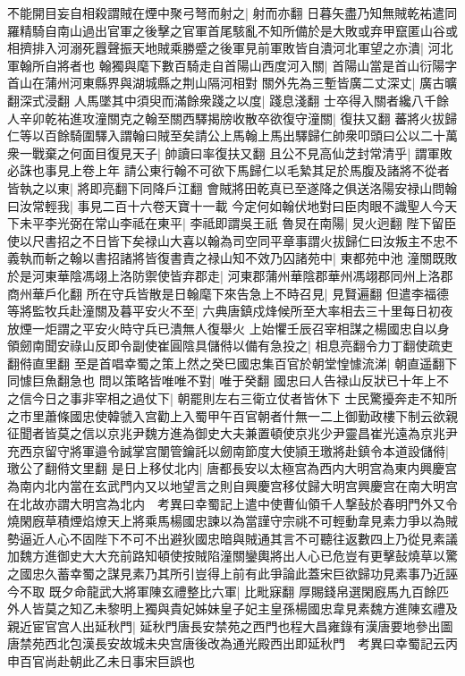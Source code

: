 不能開目妄自相殺謂賊在煙中聚弓弩而射之|{
	射而亦翻}
日暮矢盡乃知無賊乾祐遣同羅精騎自南山過出官軍之後擊之官軍首尾駭亂不知所備於是大敗或弃甲竄匿山谷或相擠排入河溺死囂聲振天地賊乘勝蹙之後軍見前軍敗皆自潰河北軍望之亦潰|{
	河北軍翰所自將者也}
翰獨與麾下數百騎走自首陽山西度河入關|{
	首陽山當是首山衍陽字首山在蒲州河東縣界與湖城縣之荆山隔河相對}
關外先為三塹皆廣二丈深丈|{
	廣古曠翻深式浸翻}
人馬墜其中須臾而滿餘衆踐之以度|{
	踐息淺翻}
士卒得入關者纔八千餘人辛卯乾祐進攻潼關克之翰至關西驛揭牓收散卒欲復守潼關|{
	復扶又翻}
蕃將火拔歸仁等以百餘騎圍驛入謂翰曰賊至矣請公上馬翰上馬出驛歸仁帥衆叩頭曰公以二十萬衆一戰棄之何面目復見天子|{
	帥讀曰率復扶又翻}
且公不見高仙芝封常清乎|{
	謂軍敗必誅也事見上卷上年}
請公東行翰不可欲下馬歸仁以毛縶其足於馬腹及諸將不從者皆執之以東|{
	將即亮翻下同降戶江翻}
會賊將田乾真已至遂降之俱送洛陽安禄山問翰曰汝常輕我|{
	事見二百十六卷天寶十一載}
今定何如翰伏地對曰臣肉眼不識聖人今天下未平李光弼在常山李祗在東平|{
	李祗即謂吳王祇}
魯炅在南陽|{
	炅火迥翻}
陛下留臣使以尺書招之不日皆下矣禄山大喜以翰為司空同平章事謂火拔歸仁曰汝叛主不忠不義執而斬之翰以書招諸將皆復書責之禄山知不效乃囚諸苑中|{
	東都苑中池}
潼關既敗於是河東華陰馮翊上洛防禦使皆弃郡走|{
	河東郡蒲州華陰郡華州馮翊郡同州上洛郡商州華戶化翻}
所在守兵皆散是日翰麾下來告急上不時召見|{
	見賢遍翻}
但遣李福德等將監牧兵赴潼關及暮平安火不至|{
	六典唐鎮戍烽候所至大率相去三十里每日初夜放煙一炬謂之平安火時守兵已潰無人復舉火}
上始懼壬辰召宰相謀之楊國忠自以身領劒南聞安祿山反即令副使崔圓陰具儲偫以備有急投之|{
	相息亮翻令力丁翻使疏吏翻偫直里翻}
至是首唱幸蜀之策上然之癸巳國忠集百官於朝堂惶懅流涕|{
	朝直遥翻下同懅巨魚翻急也}
問以策略皆唯唯不對|{
	唯于癸翻}
國忠曰人告禄山反狀已十年上不之信今日之事非宰相之過仗下|{
	朝罷則左右三衛立仗者皆休下}
士民驚擾奔走不知所之市里蕭條國忠使韓虢入宫勸上入蜀甲午百官朝者什無一二上御勤政樓下制云欲親征聞者皆莫之信以京兆尹魏方進為御史大夫兼置頓使京兆少尹靈昌崔光遠為京兆尹充西京留守將軍邉令誠掌宫闈管鑰託以劒南節度大使頴王璬將赴鎮令本道設儲偫|{
	璬公了翻偫文里翻}
是日上移仗北内|{
	唐都長安以太極宫為西内大明宫為東内興慶宫為南内北内當在玄武門内又以地望言之則自興慶宫移仗歸大明宫興慶宫在南大明宫在北故亦謂大明宫為北内　考異曰幸蜀記上遣中使曹仙領千人撃鼔於春明門外又令燒閑廐草積煙焰燎天上將乘馬楊國忠諫以為當謹守宗祧不可輕動韋見素力爭以為賊勢逼近人心不固陛下不可不出避狄國忠暗與賊通其言不可聽往返數四上乃從見素議加魏方進御史大大充前路知頓使按賊陷潼關鑾輿將出人心已危豈有更擊鼔燒草以驚之國忠久蓄幸蜀之謀見素乃其所引豈得上前有此爭論此蓋宋巨欲歸功見素事乃近誣今不取}
既夕命龍武大將軍陳玄禮整比六軍|{
	比毗寐翻}
厚賜錢帛選閑廐馬九百餘匹外人皆莫之知乙未黎明上獨與貴妃姊妹皇子妃主皇孫楊國忠韋見素魏方進陳玄禮及親近宦官宫人出延秋門|{
	延秋門唐長安禁苑之西門也程大昌雍錄有漢唐要地參出圖唐禁苑西北包漢長安故城未央宫唐後改為通光殿西出即延秋門　考異曰幸蜀記云丙申百官尚赴朝此乙未日事宋巨誤也}

